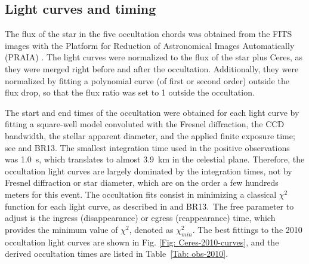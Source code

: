 \documentclass[useAMS,usenatbib]{mn2e}
\begin{document}
\subsection{Light curves and timing \label{Sec: light-curve-2010}}

The flux of the star in the five occultation chords was obtained from the FITS images with the Platform for Reduction of Astronomical Images Automatically (PRAIA) \citep{2011gfun.conf...85A}. The light curves were normalized to the flux of the star plus Ceres, as they were merged right before and after the occultation. Additionally,
 they were normalized by fitting a polynomial curve (of first or second order) outside the flux drop, so that the flux ratio was set to 1 outside the occultation.

The start and end times of the occultation were obtained for each light curve by fitting a square-well model convoluted with the Fresnel diffraction, the CCD bandwidth, the stellar apparent diameter, and the applied finite exposure time; see \cite{Widemann2009} and BR13. %
The smallest integration time used in the positive observations was 1.0~s, which translates to almost 3.9~km in the celestial plane. Therefore, the occultation light curves are largely dominated by the integration times, not by Fresnel diffraction or star diameter, which are on the order a few hundreds meters for this event.
The occultation fits consist in minimizing a classical $\chi^{2}$ function for each light curve, as described in \cite{Sicardy2011} and BR13.\ The free parameter to adjust is the ingress (disappearance) or egress (reappearance) time, which provides the minimum value of $\chi^{2}$, denoted as $\chi^{2}_{min}$. The best fittings to the 2010 occultation light curves are shown in Fig. \ref{Fig: Ceres-2010-curves}, and the derived occultation times are listed in Table~\ref{Tab: obs-2010}.
\end{document}
